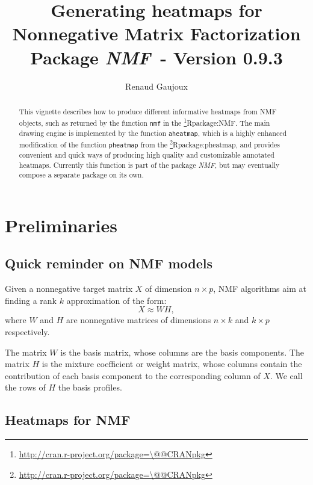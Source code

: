 \documentclass[a4paper]{article}\usepackage{graphicx, color}
\makeatletter
\let\code=\texttt
\newcommand{\pkgname}[1]{\textit{#1}\xspace}
\newcommand{\CRANurl}[1]{\url{http://cran.r-project.org/package=#1}}
\def\CRANpkg{\@ifstar\@CRANpkg\@@CRANpkg}
\def\@CRANpkg#1{\href{http://cran.r-project.org/package=#1}{\pkgname{#1}}\footnote{\CRANurl{#1}}}
\def\@@CRANpkg#1{\href{http://cran.r-project.org/package=#1}{\pkgname{#1}} package\footnote{\CRANurl{#1}}}
\def\citeCRANpkg{\@ifstar\@citeCRANpkg\@@citeCRANpkg}
\def\@citeCRANpkg#1{\CRANpkg{#1}\cite*{Rpackage:#1}}
\def\@@citeCRANpkg#1{\CRANpkg{#1}~\cite{Rpackage:#1}}
\newcommand{\nmfpack}{\pkgname{NMF}}
\renewcommand{\cite}[1]{\parencite{#1}}
\makeatother
\begin{document}
\title{Generating heatmaps for Nonnegative Matrix Factorization\\
\small Package \nmfpack\ - Version 0.9.3}
\author{Renaud Gaujoux}

\maketitle

\begin{abstract}
This vignette describes how to produce different informative heatmaps from NMF objects, 
such as returned by the function \code{nmf} in the \citeCRANpkg{NMF}.
The main drawing engine is implemented by the function \code{aheatmap}, which is 
a highly enhanced modification of the function \code{pheatmap} from the \citeCRANpkg{pheatmap},
and provides convenient and quick ways of producing high quality and customizable annotated heatmaps.
Currently this function is part of the package \nmfpack, but may eventually 
compose a separate package on its own.
\end{abstract}

{\small \tableofcontents}

\section{Preliminaries}

\subsection{Quick reminder on NMF models}

Given a nonnegative target matrix $X$ of dimension $n\times p$, NMF algorithms 
aim at finding a rank $k$ approximation of the form:
$$
X \approx W H,
$$
where $W$ and $H$ are nonnegative matrices of dimensions $n\times k$ and $k\times p$ 
respectively.

The matrix $W$ is the basis matrix, whose columns are the basis components.
The matrix $H$ is the mixture coefficient or weight matrix, whose columns contain 
the contribution of each basis component to the corresponding column of $X$.
We call the rows of $H$ the basis profiles.

\subsection{Heatmaps for NMF}
\end{document}
